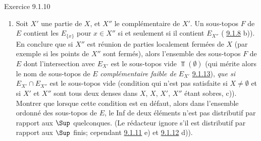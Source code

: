 \documentclass[10pt]{../fichiers-configuration-latex/smfart}
\begin{document}
\begin{enonce*}[remark]{Exercice 9.1.10}
\begin{enumerate}
\item Soit $X'$ une partie de $X$, et $X''$ le complémentaire de
$X'$. Un sous-topos $F$ de $E$ contient les $E_{\{x\}}$ pour $x\in
X''$ si et seulement si il contient $E_{X''}$ (\cf
\hyperref[IV.exer9.1.8]{9.1.8} b)). En conclure que si $X''$ est réunion de
parties localement fermées de $X$ (par exemple si les points de
$X''$ sont fermés), alors l'ensemble des sous-topos $F$ de $E$ dont
l'intersection avec $E_{X'}$ est le sous-topos vide $\Top(∅)$
 (qui mérite alors le nom de
sous-topos de $E$ \emph{complémentaire faible de} $E_{X'}$ \cf
\hyperref[IV.exer9.1.13]{9.1.13}), \emph{que si} $E_{X'}\cap E_{X''}$ est le
sous-topos vide (condition qui n'est pas satisfaite si $X\neq ∅$
et si $X'$ et $X''$ sont tous deux denses dans $X$, $X$, $X'$, $X''$
étant sobres, \cf c)). Montrer que lorsque cette condition est en
défaut, alors dans l'ensemble ordonné des sous-topos de $E$, le Inf
de deux éléments n'est pas distributif par rapport aux $\Sup$
quelconques. (Le rédacteur ignore s'il est distributif par rapport
aux $\Sup$ finis; \cf cependant \hyperref[IV.exer9.1.11]{9.1.11} e) et
\hyperref[IV.exer9.1.12]{9.1.12} d)).
\end{enumerate}
\end{enonce*}
\end{document}

